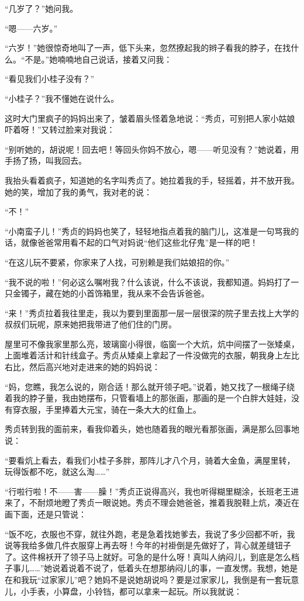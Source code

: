 \par “几岁了？”她问我。
\par “嗯——六岁。”
\par “六岁！”她很惊奇地叫了一声，低下头来，忽然撩起我的辫子看我的脖子，在找什么。“不是。”她喃喃地自己说话，接着又问我：
\par “看见我们小桂子没有？”
\par “小桂子？”我不懂她在说什么。
\par 这时大门里疯子的妈妈出来了，皱着眉头怪着急地说：“秀贞，可别把人家小姑娘吓着呀！”又转过脸来对我说：
\par “别听她的，胡说呢！回去吧！等回头你妈不放心，嗯——听见没有？”她说着，用手扬了扬，叫我回去。
\par 我抬头看着疯子，知道她的名字叫秀贞了。她拉着我的手，轻摇着，并不放开我。她的笑，增加了我的勇气，我对老的说：
\par “不！”
\par “小南蛮子儿！”秀贞的妈妈也笑了，轻轻地指点着我的脑门儿，这准是一句骂我的话，就像爸爸常用看不起的口气对妈说“他们这些北仔鬼”是一样的吧！
\par “在这儿玩不要紧，你家来了人找，可别赖是我们姑娘招的你。”
\par “我不说的啦！”何必这么嘱咐我？什么该说，什么不该说，我都知道。妈妈打了一只金镯子，藏在她的小首饰箱里，我从来不会告诉爸爸。
\par “来！”秀贞拉着我往里走，我以为要到里面那一层一层很深的院子里去找上大学的叔叔们玩呢，原来她把我带进了他们住的门房。
\par 屋里可不像我家里那么亮，玻璃窗小得很，临窗一个大炕，炕中间摆了一张矮桌，上面堆着活计和针线盒子。秀贞从矮桌上拿起了一件没做完的衣服，朝我身上左比右比，然后高兴地对走进来的她的妈妈说：
\par “妈，您瞧，我怎么说的，刚合适！那么就开领子吧。”说着，她又找了一根绳子绕着我的脖子量，我由她摆布，只管看墙上的那张画，那画的是一个白胖大娃娃，没有穿衣服，手里捧着大元宝，骑在一条大大的红鱼上。
\par 秀贞转到我的面前来，看我仰着头，她也随着我的眼光看那张画，满是那么回事地说：
\par “要看炕上看去，看我们小桂子多胖，那阵儿才八个月，骑着大金鱼，满屋里转，玩得饭都不吃，就这么淘……”
\par “行啦行啦！不——害——臊！”秀贞正说得高兴，我也听得糊里糊涂，长班老王进来了，不耐烦地瞪了秀贞一眼说她。秀贞不理会她爸爸，推着我脱鞋上炕，凑近在画下面，还是只管说：
\par “饭不吃，衣服也不穿，就往外跑，老是急着找她爹去，我说了多少回都不听，我说等我给多做几件衣服穿上再去呀！今年的衬褂倒是先做好了，背心就差缝钮子了。这件棉袄开了领子马上就好。可急的是什么呀！真叫人纳闷儿，到底是怎么档子事儿……”她说着说着不说了，低着头在想那纳闷儿的事，一直发愣。我想，她是在和我玩“过家家儿”吧？她妈不是说她胡说吗？要是过家家儿，我倒是有一套玩意儿，小手表，小算盘，小铃铛，都可以拿来一起玩。所以我就说：
